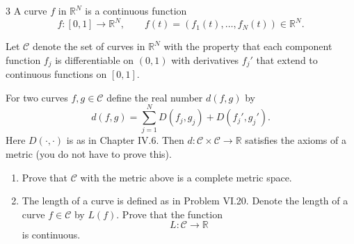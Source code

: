 \documentclass[12pt]{article}
\begin{document}
\newpage 

\begin{problem}{3}
    A curve $f$ in $\mathbb{R}^N$ is a continuous function
    \[
    f:[0,1]\to \mathbb{R}^N, \qquad 
    f(t)=(f_1(t),\ldots,f_N(t))\in\mathbb{R}^N .
    \]

    Let $\mathcal{C}$ denote the set of curves in $\mathbb{R}^N$ with the property that each component function $f_j$ is differentiable on $(0,1)$ with derivatives $f_j'$ that extend to continuous functions on $[0,1]$.

    For two curves $f,g\in\mathcal{C}$ define the real number $d(f,g)$ by
    \[
    d(f,g)=\sum_{j=1}^{N} D(f_j,g_j)+D(f_j',g_j').
    \]
    Here $D(\cdot,\cdot)$ is as in Chapter IV.6. Then $d:\mathcal{C}\times\mathcal{C}\to\mathbb{R}$ satisfies the axioms of a metric (you do not have to prove this).

    \begin{enumerate}
    \item[(a)] Prove that $\mathcal{C}$ with the metric above is a complete metric space.

    \item[(b)] The length of a curve is defined as in Problem VI.20. Denote the length of a curve $f\in\mathcal{C}$ by $L(f)$. Prove that the function
    \[L:\mathcal{C}\to\mathbb{R}\]
    is continuous.
    \end{enumerate}
\end{problem}
\end{document}
